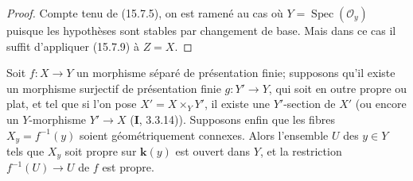 \begin{proof}
Compte tenu de (15.7.5), on est ramené au cas où $Y=\operatorname{Spec}(\mathcal O_y)$ puisque les hypothèses sont stables par changement de base. Mais dans ce cas il suffit d'appliquer (15.7.9) à $Z=X$.
\end{proof}

\begin{corollary}[15.7.11]
\label{IV.15.7.11-fr}
Soit $f:X\to Y$ un morphisme séparé de présentation finie; supposons qu'il existe un morphisme surjectif de présentation finie $g:Y'\to Y$, qui soit en outre propre ou plat, et tel que si l'on pose $X'=X\times_Y Y'$, il existe une $Y'$-section de $X'$ (ou encore un $Y$-morphisme $Y'\to X$ (\textbf{I}, 3.3.14)). Supposons enfin que les fibres $X_y=f^{-1}(y)$ soient géométriquement connexes. Alors l'ensemble $U$ des $y\in Y$ tels que $X_y$ soit propre sur $\mathbf k(y)$ est ouvert dans $Y$, et la restriction $f^{-1}(U)\to U$ de $f$ est propre.
\end{corollary}

